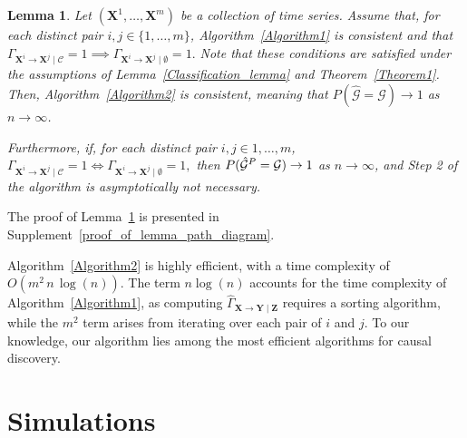 \documentclass[a4paper,11pt]{article}
\newtheorem{lemma}{Lemma}
\begin{document}
\begin{lemma}
\label{lemma_path_diagram}
Let \((\textbf{X}^1, \dots, \textbf{X}^m)\) be a collection of time series. Assume that, for each distinct pair \(i, j \in \{1, \dots, m\}\), Algorithm~\ref{Algorithm1} is consistent and that $\Gamma_{\textbf{X}^i \to \textbf{X}^j \mid \mathcal{C}} = 1 \implies \Gamma_{\textbf{X}^i \to \textbf{X}^j \mid \emptyset} = 1.$
Note that these conditions are satisfied under the assumptions of Lemma~\ref{Classification_lemma} and Theorem~\ref{Theorem1}. Then, Algorithm~\ref{Algorithm2} is consistent, meaning that \(P({\hat{\mathcal{G}}} = \mathcal{G}) \to 1\) as \(n \to \infty\).

Furthermore, if, for each distinct pair $i, j\in{1, \dots, m}$, $\Gamma_{\textbf{X}^i\to\textbf{X}^j\mid\mathcal{C}} = 1 \iff  \Gamma_{\textbf{X}^i\to\textbf{X}^j\mid \emptyset} = 1,   $
then $P({\hat{\mathcal{G}}^{\rm P}} = \mathcal{G})\to 1$ as $n\to\infty$, and Step 2 of the algorithm is asymptotically not necessary. 
\end{lemma}
The proof of Lemma~\ref{lemma_path_diagram} is presented in Supplement~\ref{proof_of_lemma_path_diagram}. 

Algorithm~\ref{Algorithm2} is highly efficient, with a time complexity of $O(m^2\, n\,\log(n))$. The term $n\log(n)$ accounts for the time complexity of Algorithm~\ref{Algorithm1}, as computing $\hat{\Gamma}_{\textbf{X}\to\textbf{Y}\mid\textbf{Z}}$ requires a sorting algorithm, while the $m^2$ term arises from iterating over each pair of $i$ and $j$. To our knowledge, our algorithm lies among the most efficient algorithms for causal discovery. 





































\section{Simulations}
\label{Section6}
\end{document}
